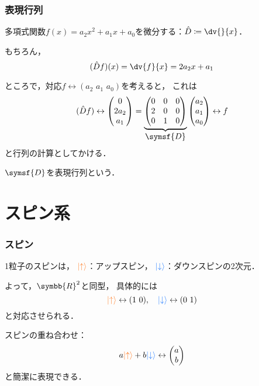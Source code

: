 \documentclass[
    10pt,
    ]{sotsu-beamer}
\newcommand{\upspin}{\mathcolor{red}{\ket{\uparrow}}}
\newcommand{\dwspin}{\mathcolor{blue}{\ket{\downarrow}}}
\begin{document}
\begin{frame}
    \frametitle{表現行列}

    多項式関数$f(x) = a_2 x^2 + a_1 x + a_0$を微分する：$\hat{D} \coloneq \dv{}{x}$．

    \pause

    もちろん，
    \begin{equation*}
        (\hat{D} f) (x) = \dv{f}{x} = 2 a_2 x + a_1
    \end{equation*}

    \pause

    ところで，対応$f \leftrightarrow (a_2 \,\, a_1 \,\, a_0)$を考えると，
    これは
    \begin{equation*}
        (\hat{D} f)
        \leftrightarrow
        \begin{pmatrix}
            0  \\  2 a_2  \\  a_1
        \end{pmatrix}
        =
        \underbrace{
        \begin{pmatrix}
            0  &  0  &  0  \\
            2  &  0  &  0  \\
            0  &  1  &  0
        \end{pmatrix}
        }_{\text{\normalsize$\symsf{D}$}}
        \begin{pmatrix}
            a_2  \\  a_1  \\  a_0
        \end{pmatrix}
        \leftrightarrow
        f
    \end{equation*}
    と行列の計算としてかける．

    \pause

    $\symsf{D}$を\alert{表現行列}という．

\end{frame}



\section{スピン系}

\begin{frame}
    \frametitle{スピン}

    1粒子のスピンは，
    $\upspin$：アップスピン，
    $\dwspin$：ダウンスピンの2次元．

    \pause

    よって，$\symbb{R}^2$と同型，
    具体的には
    \begin{equation*}
        \upspin \leftrightarrow (1 \,\, 0),
        \quad 
        \dwspin \leftrightarrow (0 \,\, 1)
    \end{equation*}
    と対応させられる．

    \pause

    スピンの重ね合わせ：
    \[  a \upspin + b \dwspin \leftrightarrow 
    \begin{pmatrix}
        a  \\  b
    \end{pmatrix}  \]
    と簡潔に表現できる．

\end{frame}
\end{document}
